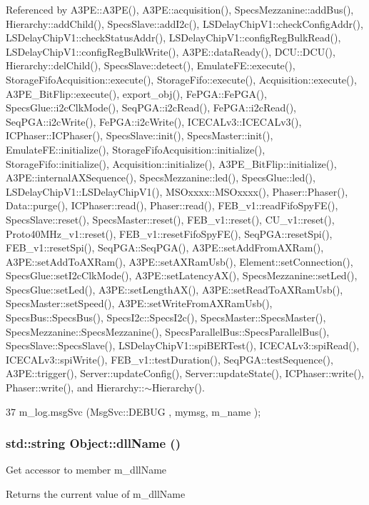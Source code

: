 Referenced by A3PE::A3PE(), A3PE::acquisition(), SpecsMezzanine::addBus(), Hierarchy::addChild(), SpecsSlave::addI2c(), LSDelayChipV1::checkConfigAddr(), LSDelayChipV1::checkStatusAddr(), LSDelayChipV1::configRegBulkRead(), LSDelayChipV1::configRegBulkWrite(), A3PE::dataReady(), DCU::DCU(), Hierarchy::delChild(), SpecsSlave::detect(), EmulateFE::execute(), StorageFifoAcquisition::execute(), StorageFifo::execute(), Acquisition::execute(), A3PE\_\-BitFlip::execute(), export\_\-obj(), FePGA::FePGA(), SpecsGlue::i2cClkMode(), SeqPGA::i2cRead(), FePGA::i2cRead(), SeqPGA::i2cWrite(), FePGA::i2cWrite(), ICECALv3::ICECALv3(), ICPhaser::ICPhaser(), SpecsSlave::init(), SpecsMaster::init(), EmulateFE::initialize(), StorageFifoAcquisition::initialize(), StorageFifo::initialize(), Acquisition::initialize(), A3PE\_\-BitFlip::initialize(), A3PE::internalAXSequence(), SpecsMezzanine::led(), SpecsGlue::led(), LSDelayChipV1::LSDelayChipV1(), MSOxxxx::MSOxxxx(), Phaser::Phaser(), Data::purge(), ICPhaser::read(), Phaser::read(), FEB\_\-v1::readFifoSpyFE(), SpecsSlave::reset(), SpecsMaster::reset(), FEB\_\-v1::reset(), CU\_\-v1::reset(), Proto40MHz\_\-v1::reset(), FEB\_\-v1::resetFifoSpyFE(), SeqPGA::resetSpi(), FEB\_\-v1::resetSpi(), SeqPGA::SeqPGA(), A3PE::setAddFromAXRam(), A3PE::setAddToAXRam(), A3PE::setAXRamUsb(), Element::setConnection(), SpecsGlue::setI2cClkMode(), A3PE::setLatencyAX(), SpecsMezzanine::setLed(), SpecsGlue::setLed(), A3PE::setLengthAX(), A3PE::setReadToAXRamUsb(), SpecsMaster::setSpeed(), A3PE::setWriteFromAXRamUsb(), SpecsBus::SpecsBus(), SpecsI2c::SpecsI2c(), SpecsMaster::SpecsMaster(), SpecsMezzanine::SpecsMezzanine(), SpecsParallelBus::SpecsParallelBus(), SpecsSlave::SpecsSlave(), LSDelayChipV1::spiBERTest(), ICECALv3::spiRead(), ICECALv3::spiWrite(), FEB\_\-v1::testDuration(), SeqPGA::testSequence(), A3PE::trigger(), Server::updateConfig(), Server::updateState(), ICPhaser::write(), Phaser::write(), and Hierarchy::$\sim$Hierarchy().


\begin{DoxyCode}
37 { m_log.msgSvc (MsgSvc::DEBUG   , mymsg, m_name ); }
\end{DoxyCode}
\hypertarget{classObject_a2e3947f2870094c332d7454117f3ec63}{
\subsubsection[{dllName}]{\setlength{\rightskip}{0pt plus 5cm}std::string Object::dllName ()}}
\label{classObject_a2e3947f2870094c332d7454117f3ec63}
Get accessor to member m\_\-dllName \begin{DoxyReturn}{Returns}
the current value of m\_\-dllName 
\end{DoxyReturn}


